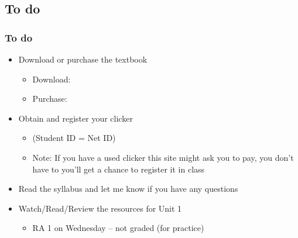 \documentclass[slidestop,compress,mathserif,12pt,t,professionalfonts,xcolor=table]{beamer}
\begin{document}

\subsection{To do}


\begin{frame}
\frametitle{To do}

\begin{itemize}

\item Download or purchase the textbook
\begin{itemize}
\item Download: 
\item Purchase: 
\end{itemize}

\item Obtain and register your clicker
\begin{itemize}
\item {} (Student ID = Net ID) 
\item Note: If you have a used clicker this site might ask you to pay, you don't have to
you'll get a chance to register it in class
\end{itemize}

\item Read the syllabus and let me know if you have any questions

\item Watch/Read/Review the resources for Unit 1
\begin{itemize}
\item RA 1 on Wednesday -- not graded (for practice)
\end{itemize}

\end{itemize}

\end{frame}

\end{document}
